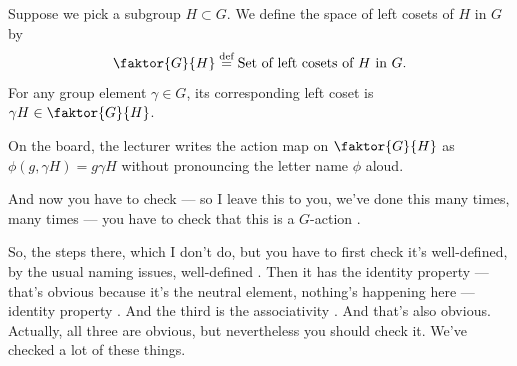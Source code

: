 \begin{content}
Suppose we pick a subgroup $H \subset G$. We define the space of left cosets of $H$ in $G$ by
\[
\faktor{G}{H} \stackrel{\text{def}}{=} \text{Set of left cosets of } H \text{ in } G.
\]
For any group element $\gamma \in G$, its corresponding left coset is $\gamma H \in \faktor{G}{H}$.

\end{content}

\begin{aiNote}
On the board, the lecturer writes the action map on $\faktor{G}{H}$ as $\phi(g, \gamma H) = g\gamma H$ without pronouncing the letter name $\phi$ aloud.
\end{aiNote}

\begin{hidden}
\end{hidden}

\begin{speech}[00:12:14 - 00:12:56]
And now you have to check --- so I leave this to you, we've done this many times, many times --- you have to check that this is a $G$-action .

So, the steps there, which I don't do, but you have to first check it's well-defined, by the usual naming issues, well-defined . Then it has the identity property --- that's obvious because it's the neutral element, nothing's happening here --- identity property . And the third is the associativity . And that's also obvious. Actually, all three are obvious, but nevertheless you should check it. We've checked a lot of these things.
\end{speech}

